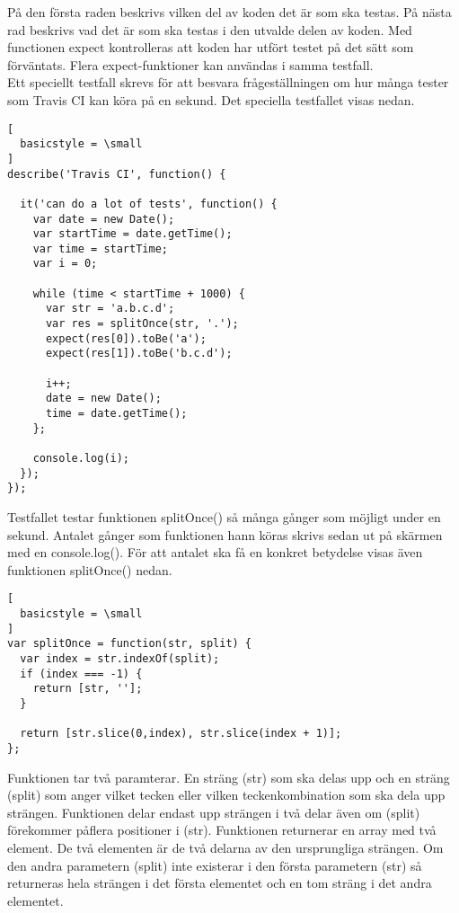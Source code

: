 På den första raden beskrivs vilken del av koden det är som ska testas.
På nästa rad beskrivs vad det är som ska testas i den utvalde delen av koden.
Med functionen expect kontrolleras att koden har utfört testet på det sätt
som förväntats. Flera expect-funktioner kan användas i samma testfall.\\

Ett speciellt testfall skrevs
för att besvara frågeställningen om hur många tester som Travis CI kan köra
på en sekund. Det speciella testfallet visas nedan.

\begin{lstlisting}[
  basicstyle = \small
]
describe('Travis CI', function() {
	
  it('can do a lot of tests', function() {
    var date = new Date();
    var startTime = date.getTime();
    var time = startTime;
    var i = 0;

    while (time < startTime + 1000) {  
      var str = 'a.b.c.d';
      var res = splitOnce(str, '.');
      expect(res[0]).toBe('a');
      expect(res[1]).toBe('b.c.d');

      i++;
      date = new Date(); 
      time = date.getTime();
    };

    console.log(i);
  });
});
\end{lstlisting}

Testfallet testar funktionen splitOnce() så många gånger som möjligt
under en sekund. Antalet gånger som funktionen hann köras skrivs
sedan ut på skärmen med en console.log(). För att antalet ska
få en konkret betydelse visas även funktionen splitOnce() nedan.

\begin{lstlisting}[
  basicstyle = \small
]
var splitOnce = function(str, split) {
  var index = str.indexOf(split);
  if (index === -1) {
    return [str, ''];
  }

  return [str.slice(0,index), str.slice(index + 1)];
};
\end{lstlisting}

Funktionen tar två paramterar. En sträng (str) som ska delas upp och 
en sträng (split) som anger vilket tecken eller vilken teckenkombination
som ska dela upp strängen. Funktionen delar endast upp strängen i två delar
även om (split) förekommer påflera positioner i (str). Funktionen returnerar 
en array med två element.
De två elementen är de två delarna av den ursprungliga strängen. Om den andra
parametern (split) inte existerar i den första parametern (str) så returneras
hela strängen i det första elementet och en tom sträng i det andra elementet.

